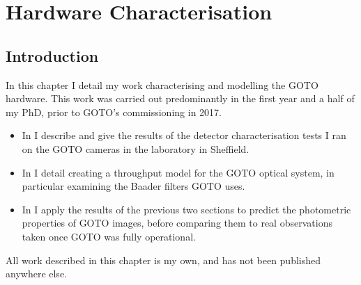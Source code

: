 \chapter{Hardware Characterisation}
\label{chap:hardware}
\chaptoc{}


\newpage
\section{Introduction}
\label{sec:hardware_intro}
\begin{colsection}

In this chapter I detail my work characterising and modelling the GOTO hardware. This work was carried out predominantly in the first year and a half of my PhD, prior to GOTO's commissioning in 2017.
%
\begin{itemize}
    \item In  I describe and give the results of the detector characterisation tests I ran on the GOTO cameras in the laboratory in Sheffield.
    \item In  I detail creating a throughput model for the GOTO optical system, in particular examining the Baader filters GOTO uses.
    \item In  I apply the results of the previous two sections to predict the photometric properties of GOTO images, before comparing them to real observations taken once GOTO was fully operational.
\end{itemize}
%
All work described in this chapter is my own, and has not been published anywhere else.

\end{colsection}


\newpage
